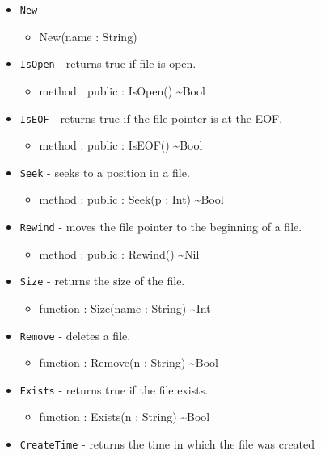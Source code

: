 \documentclass[11pt]{article}
\begin{document}
\begin{itemize}
\item \texttt{New}
  \begin{itemize}
  \item New(name : String)
  \end{itemize}
\item \texttt{IsOpen} - returns true if file is open.
  \begin{itemize}
  \item method : public : IsOpen() \textasciitilde Bool
  \end{itemize}
\item \texttt{IsEOF} - returns true if the file pointer is at the EOF.
  \begin{itemize}
  \item method : public : IsEOF() \textasciitilde Bool
  \end{itemize}
\item \texttt{Seek} - seeks to a position in a file.
  \begin{itemize}
  \item method : public : Seek(p : Int) \textasciitilde Bool
  \end{itemize}
\item \texttt{Rewind} - moves the file pointer to the beginning of a
  file.
  \begin{itemize}
  \item method : public : Rewind() \textasciitilde Nil
  \end{itemize}
\item \texttt{Size} - returns the size of the file.
  \begin{itemize}
  \item function : Size(name : String) \textasciitilde Int
  \end{itemize}
\item \texttt{Remove} - deletes a file.
  \begin{itemize}
  \item function : Remove(n : String) \textasciitilde Bool
  \end{itemize}
\item \texttt{Exists} - returns true if the file exists.
  \begin{itemize}
  \item function : Exists(n : String) \textasciitilde Bool
  \end{itemize}
\item \texttt{CreateTime} - returns the time in which the file was
  created
  \begin{itemize}

\end{itemize}
\end{itemize}
\end{document}
